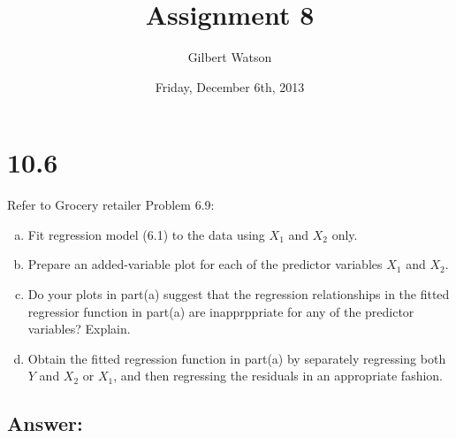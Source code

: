 \documentclass{article}
\begin{document}


\title{Assignment 8}
\author{Gilbert Watson}
\date{Friday, December 6th, 2013}





\maketitle
\tableofcontents

\section{10.6}

Refer to Grocery retailer Problem 6.9:

\begin{enumerate}[a)]
\item{} Fit regression model (6.1) to the data using $X_1$ and $X_2$ only.
\item{} Prepare an added-variable plot for each of the predictor variables $X_1$ and $X_2$.
\item{} Do your plots in part(a) suggest that the regression relationships in the fitted regressior function in part(a) are inapprppriate for any of the predictor variables? Explain.
\item{} Obtain the fitted regression function in part(a) by separately regressing both $Y$ and $X_2$ or $X_1$, and then regressing the residuals in an appropriate fashion.
\end{enumerate}

\subsection{Answer:}
\end{document}
